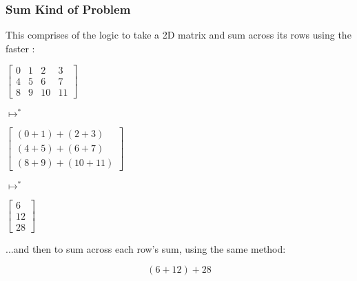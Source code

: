 \documentclass[aspectratio=169]{beamer}
\begin{document}
\begin{frame}[fragile]
  \frametitle{Sum Kind of Problem}

  This comprises of the logic to take a 2D matrix and sum across its rows using
  the faster :

  \begin{center}
  \pause
  \begin{minipage}{0.2\textwidth}
    \centering
    $\begin{bmatrix}
      0 & 1 & 2 & 3\\
      4 & 5 & 6 & 7 \\
      8 & 9 & 10 & 11
    \end{bmatrix}$
  \end{minipage}
  \pause
  \begin{minipage}{0.12\textwidth}
    \centering
    $\longmapsto^*$
  \end{minipage}
  \begin{minipage}{0.3\textwidth}
    \centering
    $\begin{bmatrix}
      (0 + 1) + (2 + 3) \\
      (4 + 5) + (6 + 7) \\
      (8 + 9) + (10 + 11)
    \end{bmatrix}$
  \end{minipage}
  \pause
  \begin{minipage}{0.12\textwidth}
    \centering
    $\longmapsto^*$
  \end{minipage}
  \begin{minipage}{0.12\textwidth}
    \centering
    $\begin{bmatrix}
      6 \\
      12 \\
      28
    \end{bmatrix}$
  \end{minipage}
  \end{center}

  \pause
  \vspace{\fill}

  ...and then to sum across each row's sum, using the same method:

  \vspace{\fill}

  $$(6 + 12) + 28$$
\end{frame}
\end{document}
